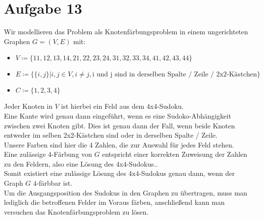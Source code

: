\documentclass[12pt, a4paper]{article}
\begin{document}
\section*{Aufgabe 13}
Wir modellieren das Problem als Knotenfärbungsproblem in einem ungerichteten Graphen $G=(V,E)$ mit:
\begin{itemize}
	\item $V \coloneqq \{11, 12, 13, 14, 21, 22, 23, 24, 31, 32, 33, 34, 41, 42, 43, 44\}$
	\item $E \coloneqq \{\{i,j\} \vert i,j \in V, i \neq j, \text{i und j sind in derselben Spalte / Zeile / 2x2-Kästchen}\}$
	\item $C \coloneqq \{1,2,3,4\}$
\end{itemize}
Jeder Knoten in $V$ ist hierbei ein Feld aus dem 4x4-Sudoku.\\
Eine Kante wird genau dann eingeführt, wenn es eine Sudoko-Abhängigkeit zwischen zwei Knoten gibt. Dies ist genau dann der Fall, wenn beide Knoten entweder im selben 2x2-Kästchen sind oder in derselben Spalte / Zeile.\\
Unsere Farben sind hier die 4 Zahlen, die zur Auswahl für jedes Feld stehen.\\

Eine zulässige $4$-Färbung von $G$ entspricht einer korrekten Zuweisung der Zahlen zu den Feldern, also eine Lösung des 4x4-Sudokus..\\
Somit existiert eine zulässige Lösung des 4x4-Sudokus genau dann, wenn der Graph $G$ $4$-färbbar ist.\\

Um die Ausgangsposition des Sudokus in den Graphen zu übertragen, muss man lediglich die betroffenen Felder im Voraus färben, anschließend kann man versuchen das Knotenfärbungsproblem zu lösen.
\end{document}
